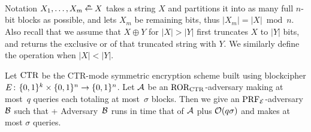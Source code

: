 
Notation $X_1,\ldots,X_m \getparse{n} X$ takes a string $X$ and partitions it
into as many full $n$-bit blocks as possible, and lets $X_m$ be remaining bits,
thus $|X_m| = |X| \bmod n$. Also recall that we assume that  $X \oplus Y$ for
$|X| > |Y|$ 
first truncates $X$ to $|Y|$ bits, and returns the exclusive or of that
truncated string with $Y$. We similarly define the operation when $|X| < |Y|$.


\begin{theorem*}
Let $\textnormal{CTR}$ be the CTR-mode symmetric encryption scheme built using blockcipher
$E{{\kern .05em}\colon{\kern .05em}}\{0,1\}^k\times\{0,1\}^n\rightarrow\{0,1\}^n$. Let ${\mathcal A}$ be an
$\textnormal{ROR}_{\textnormal{CTR}}$-adversary making at most~$q$ queries each totaling at most~$\sigma$
blocks. Then we give an $\textnormal{PRF}_{\cal E}$-adversary ${\mathcal B}$ such
that
\bnm
  \AdvROR{\CTR}{\advA} \le \AdvPRF{\cipher}{\advB} + 
\enm
Adversary~${\mathcal B}$ runs in time that of ${\mathcal A}$ plus ${\cal O}(q\sigma)$ and makes at most
$\sigma$ queries.
\end{theorem*}


